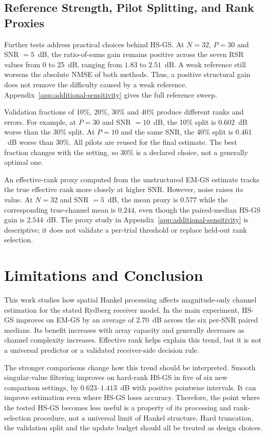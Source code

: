\documentclass[journal]{IEEEtran}
\begin{document}
\subsection{Reference Strength, Pilot Splitting, and Rank Proxies}
\label{sec:sensitivity-summary}

Further tests address practical choices behind HS-GS. At $N=32$, $P=30$
and SNR $=5$~dB, the ratio-of-sums gain remains positive across the seven
RSR values from 0 to 25~dB, ranging from $1.83$ to $2.51$~dB. A weak
reference still worsens the absolute NMSE of both methods. Thus, a positive
structural gain does not remove the difficulty caused by a weak reference.
Appendix~\ref{app:additional-sensitivity} gives the full reference sweep.

Validation fractions of 10\%, 20\%, 30\% and 40\% produce different ranks
and errors. For example, at $P=30$ and SNR $=10$~dB, the 10\% split is
$0.602$~dB worse than the 30\% split. At $P=10$ and the same SNR, the
40\% split is $0.461$~dB worse than 30\%. All pilots are reused for the
final estimate. The best fraction changes with the setting, so 30\% is a
declared choice, not a generally optimal one.

An effective-rank proxy computed from the unstructured EM-GS estimate
tracks the true effective rank more closely at higher SNR. However, noise
raises its value. At $N=32$ and SNR $=5$~dB, the mean proxy is $0.577$
while the corresponding true-channel mean is $0.244$, even though the
paired-median HS-GS gain is $2.544$~dB. The proxy study in
Appendix~\ref{app:additional-sensitivity} is descriptive; it does not
validate a per-trial threshold or replace held-out rank selection.

\section{Limitations and Conclusion}

This work studies how spatial Hankel processing affects magnitude-only
channel estimation for the stated Rydberg receiver model. In the main
experiment, HS-GS improves on EM-GS by an average of $2.70$~dB across the
six per-SNR paired medians. Its benefit increases with array capacity and
generally decreases as channel complexity increases. Effective rank helps
explain this trend, but it is not a universal predictor or a validated
receiver-side decision rule.

The stronger comparisons change how this trend should be interpreted.
Smooth singular-value filtering improves on hard-rank HS-GS in five of
six new comparison settings, by $0.623$--$1.413$~dB with positive
pointwise intervals. It can improve estimation even where HS-GS loses
accuracy. Therefore, the point where the tested HS-GS becomes less useful
is a property of its processing and rank-selection procedure, not a
universal limit of Hankel structure. Hard truncation, the validation split
and the update budget should all be treated as design choices.
\end{document}
